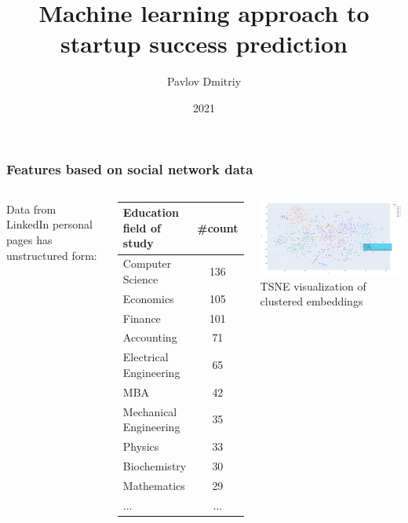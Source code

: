 \documentclass[8pt]{beamer}
\title{\huge{Machine learning approach to startup success prediction}}
\author{Pavlov Dmitriy}
\institute{Moscow Institute of Physics and Technology}
\date{2021}
\begin{document}


\begin{frame}
    \frametitle{Features based on social network data}
    
    
    
    \begin{columns}
        
        Data from LinkedIn personal pages has unstructured form:
        
        \begin{center}
            \begin{tabular}{ l c }
            Education field of study                          & \#count \\
            \hline
            Computer Science                                  & 136 \\
            Economics                                         & 105 \\ 
            Finance                                           & 101 \\
            Accounting                                        &  71 \\ 
            Electrical Engineering                            &  65 \\ 
            MBA   &  42 \\ 
            Mechanical Engineering                            &  35 \\ 
            Physics                                           &  33 \\ 
            Biochemistry                                      &  30 \\ 
            Mathematics                                       &  29 \\
            ...                                               & ... \\
            \end{tabular}
        \end{center}
    
    
       \includegraphics[width=7cm]{figures/paper/kMeans-16-03.png}
        TSNE visualization of clustered embeddings
    \end{columns}
    
\end{frame}


\end{document}

